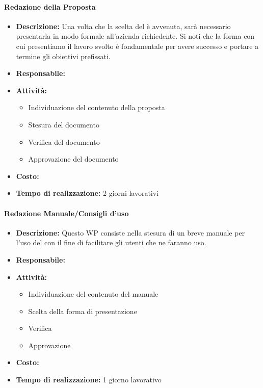 \paragraph{Redazione della Proposta }
\begin{itemize}
\item{\bfseries Descrizione:} Una volta che la scelta del  è avvenuta, sarà necessario presentarla in modo formale all'azienda richiedente. Si noti che la forma con cui presentiamo il lavoro svolto è fondamentale per avere successo e portare a termine gli obiettivi prefissati.
\item {\bfseries Responsabile:}
\item  {\bfseries Attività:}
	\begin{itemize}
	\item Individuazione del contenuto della proposta
	\item Stesura del documento
	\item Verifica del documento
 	\item Approvazione del documento	
	\end{itemize}

\item  {\bfseries Costo:}
\item  {\bfseries Tempo di realizzazione:} 2 giorni lavorativi
\end{itemize}



\paragraph{Redazione Manuale/Consigli d'uso}
\begin{itemize}
\item{\bfseries Descrizione:} Questo WP consiste nella stesura di un breve manuale per l'uso del  con il fine di facilitare gli utenti che ne faranno uso.
\item {\bfseries Responsabile:}
\item  {\bfseries Attività:}
	\begin{itemize}
	\item Individuazione del contenuto del manuale
	\item Scelta della forma di presentazione
	\item Verifica 
 	\item Approvazione	
	\end{itemize}

\item  {\bfseries Costo:}
\item  {\bfseries Tempo di realizzazione:}  1 giorno lavorativo
\end{itemize}


